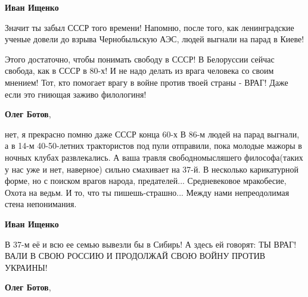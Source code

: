 \begin{itemize}
\begin{itemize}
 
\textbf{Иван Ищенко} 

Значит ты забыл СССР того времени! Напомню, после того, как ленинградские
ученые довели до взрыва Чернобыльскую АЭС, людей выгнали на парад в Киеве!

Этого достаточно, чтобы понимать свободу в СССР! В Белоруссии сейчас свобода,
как в СССР в 80-х! И не надо делать из врага человека со своим мнением! Тот,
кто помогает врагу в войне против твоей страны - ВРАГ! Даже если это гниющая
заживо филологиня!

 
\textbf{Олег Ботов},

нет, я прекрасно помню даже СССР конца 60-х В 86-м людей на парад выгнали, а в
14-м 40-50-летних трактористов под пули отправили, пока молодые мажоры в ночных
клубах развлекались. А ваша травля свободномысляшего философа(таких у нас уже и
нет, наверное) сильно смахивает на 37-й. В несколько карикатурной форме, но с
поиском врагов народа, предателей... Средневековое мракобесие, Охота на ведьм. И
то, что ты пишешь-страшно... Между нами непреодолимая стена непонимания.


 
\textbf{Иван Ищенко} 

В 37-м её и всю ее семью вывезли бы в Сибирь! А здесь ей говорят: ТЫ ВРАГ! ВАЛИ
В СВОЮ РОССИЮ И ПРОДОЛЖАЙ СВОЮ ВОЙНУ ПРОТИВ УКРАИНЫ!

 
\textbf{Олег Ботов}, 


\end{itemize}
\end{itemize}

